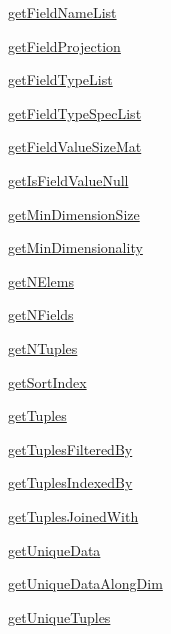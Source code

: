 \begin{list}{}{}
 \item \hyperref[method:smartdb.relations.ATypifiedStaticRelation.getFieldNameList]{getFieldNameList}
 \item \hyperref[method:smartdb.relations.ATypifiedStaticRelation.getFieldProjection]{getFieldProjection}
 \item \hyperref[method:smartdb.relations.ATypifiedStaticRelation.getFieldTypeList]{getFieldTypeList}
 \item \hyperref[method:smartdb.relations.ATypifiedStaticRelation.getFieldTypeSpecList]{getFieldTypeSpecList}
 \item \hyperref[method:smartdb.relations.ATypifiedStaticRelation.getFieldValueSizeMat]{getFieldValueSizeMat}
 \item \hyperref[method:smartdb.relations.ATypifiedStaticRelation.getIsFieldValueNull]{getIsFieldValueNull}
 \item \hyperref[method:smartdb.relations.ATypifiedStaticRelation.getMinDimensionSize]{getMinDimensionSize}
 \item \hyperref[method:smartdb.relations.ATypifiedStaticRelation.getMinDimensionality]{getMinDimensionality}
 \item \hyperref[method:smartdb.relations.ATypifiedStaticRelation.getNElems]{getNElems}
 \item \hyperref[method:smartdb.relations.ATypifiedStaticRelation.getNFields]{getNFields}
 \item \hyperref[method:smartdb.relations.ATypifiedStaticRelation.getNTuples]{getNTuples}
 \item \hyperref[method:smartdb.relations.ATypifiedStaticRelation.getSortIndex]{getSortIndex}
 \item \hyperref[method:smartdb.relations.ATypifiedStaticRelation.getTuples]{getTuples}
 \item \hyperref[method:smartdb.relations.ATypifiedStaticRelation.getTuplesFilteredBy]{getTuplesFilteredBy}
 \item \hyperref[method:smartdb.relations.ATypifiedStaticRelation.getTuplesIndexedBy]{getTuplesIndexedBy}
 \item \hyperref[method:smartdb.relations.ATypifiedStaticRelation.getTuplesJoinedWith]{getTuplesJoinedWith}
 \item \hyperref[method:smartdb.relations.ATypifiedStaticRelation.getUniqueData]{getUniqueData}
 \item \hyperref[method:smartdb.relations.ATypifiedStaticRelation.getUniqueDataAlongDim]{getUniqueDataAlongDim}
 \item \hyperref[method:smartdb.relations.ATypifiedStaticRelation.getUniqueTuples]{getUniqueTuples}

\end{list}
